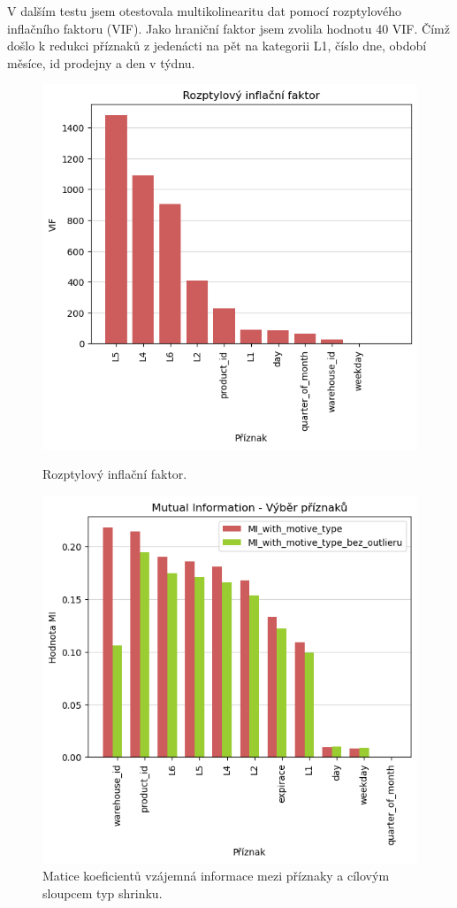 V dalším testu jsem otestovala multikolinearitu dat pomocí rozptylového inflačního faktoru (VIF). Jako hraniční faktor jsem zvolila hodnotu 40 VIF. Čímž došlo k redukci příznaků z jedenácti na pět na kategorii L1, číslo dne, období měsíce, id prodejny a den v týdnu.

\begin{figure}
    \centering
    \begin{minipage}{.5\textwidth}
      \centering
      \includegraphics[width=.8\textwidth]{obrazky/zntb/VIF.png}
      \caption{Rozptylový inflační faktor.}
      \label{obr:nb:vif}
    \end{minipage}%
    \begin{minipage}{.5\textwidth}
      \centering
      \includegraphics[width=.8\textwidth]{obrazky/zntb/MI_feature_selection.png}
      \caption{Matice koeficientů vzájemná informace mezi příznaky a cílovým sloupcem typ shrinku.}
      \label{obr:nb:MI_FS}
    \end{minipage}
    \end{figure}



